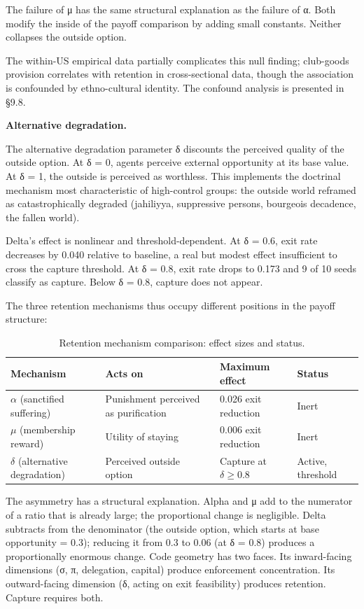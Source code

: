 \documentclass[12pt]{article}
\begin{document}
The failure of μ has the same structural explanation as the failure of α. Both modify the inside of the payoff comparison by adding small constants. Neither collapses the outside option.

%

The within-US empirical data partially complicates this null finding;
club-goods provision correlates with retention in cross-sectional data,
though the association is confounded by ethno-cultural identity. The
confound analysis is presented in \S9.8.


\textbf{Alternative degradation.}

The alternative degradation parameter δ discounts the perceived quality of the outside option. At δ = 0, agents perceive external opportunity at its base value. At δ = 1, the outside is perceived as worthless. This implements the doctrinal mechanism most characteristic of high-control groups: the outside world reframed as catastrophically degraded (jahiliyya, suppressive persons, bourgeois decadence, the fallen world).

Delta's effect is nonlinear and threshold-dependent. At δ = 0.6, exit rate decreases by 0.040 relative to baseline, a real but modest effect insufficient to cross the capture threshold. At δ = 0.8, exit rate drops to 0.173 and 9 of 10 seeds classify as capture. Below δ = 0.8, capture does not appear.

The three retention mechanisms thus occupy different positions in the payoff structure:


\begin{table}[!ht]
\caption{Retention mechanism comparison: effect sizes and status.}
\centering
\small
\begin{tabular}{p{3.5cm} p{3.5cm} p{3.5cm} p{3cm}}
\toprule
\textbf{Mechanism} & \textbf{Acts on} & \textbf{Maximum effect} & \textbf{Status} \\
\midrule
$\alpha$ (sanctified suffering) & Punishment perceived as purification & 0.026 exit reduction & Inert \\
$\mu$ (membership reward) & Utility of staying & 0.006 exit reduction & Inert \\
$\delta$ (alternative degradation) & Perceived outside option & Capture at $\delta \geq 0.8$ & Active, threshold \\
\bottomrule
\end{tabular}
\end{table}


The asymmetry has a structural explanation. Alpha and μ add to the numerator of a ratio that is already large; the proportional change is negligible. Delta subtracts from the denominator (the outside option, which starts at base opportunity = 0.3); reducing it from 0.3 to 0.06 (at δ = 0.8) produces a proportionally enormous change. Code geometry has two faces. Its inward-facing dimensions (σ, π, delegation, capital) produce enforcement concentration. Its outward-facing dimension (δ, acting on exit feasibility) produces retention. Capture requires both.
\end{document}
